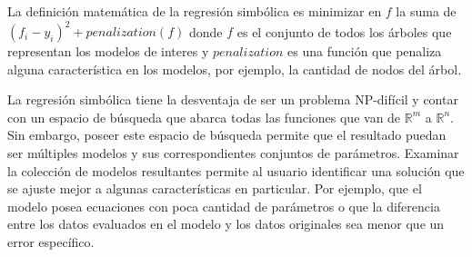 La definición matemática de la regresión simbólica es minimizar en $f$ la suma de $(f_i - y_i)^2 + penalization(f)$ donde $f$ es el conjunto de todos los árboles que representan los modelos de interes y $penalization$ es una función que penaliza alguna característica en los modelos, por ejemplo, la cantidad de nodos del árbol.



La regresión simbólica tiene la desventaja de ser un problema NP-difícil \cite{virgolin2022symbolic} y contar con un espacio de búsqueda que abarca todas las funciones que van de $\mathbb{R}^m$ a $\mathbb{R}^n$. Sin embargo, poseer este espacio de búsqueda permite que el resultado puedan ser múltiples modelos y sus correspondientes conjuntos de parámetros. Examinar la colección de modelos resultantes permite al usuario identificar una solución que se ajuste mejor a algunas características en particular. Por ejemplo, que el modelo posea ecuaciones con poca cantidad de parámetros o que la diferencia entre los datos evaluados en el modelo y los datos originales sea menor que un error específico.



